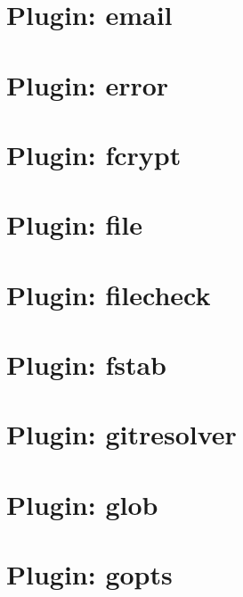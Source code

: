 \let\mypdfximage\pdfximage\def\pdfximage{\immediate\mypdfximage}\documentclass[twoside]{book}
\newcommand{\+}{\discretionary{\mbox{\scriptsize$\hookleftarrow$}}{}{}}
\begin{document}
\chapter{Plugin\+: email}
\label{md_src_plugins_email_README}

\chapter{Plugin\+: error}
\label{md_src_plugins_error_README}

\chapter{Plugin\+: fcrypt}
\label{md_src_plugins_fcrypt_README}

\chapter{Plugin\+: file}
\label{md_src_plugins_file_README}

\chapter{Plugin\+: filecheck}
\label{md_src_plugins_filecheck_README}

\chapter{Plugin\+: fstab}
\label{md_src_plugins_fstab_README}

\chapter{Plugin\+: gitresolver}
\label{md_src_plugins_gitresolver_README}

\chapter{Plugin\+: glob}
\label{md_src_plugins_glob_README}

\chapter{Plugin\+: gopts}
\label{md_src_plugins_gopts_README}

\end{document}
